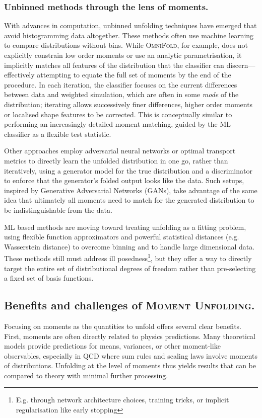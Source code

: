 {{        \subsubsection{Unbinned methods through the lens of moments.}
            With advances in computation, unbinned unfolding techniques have emerged that avoid histogramming data altogether.
            These methods often use machine learning to compare distributions without bins.
            While \textsc{OmniFold}, for example, does not explicitly constrain low order moments or use an analytic parametrisation, it implicitly matches all features of the distribution that the classifier can discern---effectively attempting to equate the full set of moments by the end of the procedure.
            In each iteration, the classifier focuses on the current differences between data and weighted simulation, which are often in some \emph{mode} of the distribution; iterating allows successively finer differences, higher order moments or localised shape features to be corrected.
            This is conceptually similar to performing an increasingly detailed moment matching, guided by the ML classifier as a flexible test statistic.
            
            Other approaches employ adversarial neural networks or optimal transport metrics to directly learn the unfolded distribution in one go, rather than iteratively, using a generator model for the true distribution and a discriminator to enforce that the generator's folded output looks like the data.
            Such setups, inspired by Generative Adversarial Networks (GANs), take advantage of the same idea that ultimately all moments need to match for the generated distribution to be indistinguishable from the data.
            
            ML based methods are moving toward treating unfolding as a fitting problem, using flexible function approximators and powerful statistical distances (e.g. Wasserstein distance) to overcome binning and to handle large dimensional data.
            These methods still must address ill posedness\footnote{E.g. through network architecture choices, training tricks, or implicit regularisation like early stopping}, but they offer a way to directly target the entire set of distributional degrees of freedom rather than pre-selecting a fixed set of basis functions.
    \subsection{Benefits and challenges of \textsc{Moment Unfolding}.}
        Focusing on moments as the quantities to unfold offers several clear benefits.
        First, moments are often directly related to physics predictions.
        Many theoretical models provide predictions for means, variances, or other moment-like observables, especially in QCD where sum rules and scaling laws involve moments of distributions.
        Unfolding at the level of moments thus yields results that can be compared to theory with minimal further processing.
        
}}
